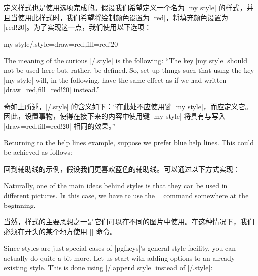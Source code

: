 定义样式也是使用选项完成的。假设我们希望定义一个名为 |my style| 的样式，并且当使用此样式时，我们希望将绘制颜色设置为 |red|，将填充颜色设置为 |red!20|。为了实现这一点，我们使用以下选项：
%
\begin{codeexample}
my style/.style={draw=red,fill=red!20}
\end{codeexample}

The meaning of the curious |/.style| is the following: ``The key |my style|
should not be used here but, rather, be defined. So, set up things such that
using the key |my style| will, in the following, have the same effect as if we
had written |draw=red,fill=red!20| instead.''

奇如上所述，|/.style| 的含义如下：“在此处不应使用键 |my style|，而应定义它。因此，设置事物，使得在接下来的内容中使用键 |my style| 将具有与写入 |draw=red,fill=red!20| 相同的效果。”

Returning to the help lines example, suppose we prefer blue help lines. This
could be achieved as follows:

回到辅助线的示例，假设我们更喜欢蓝色的辅助线。可以通过以下方式实现：
%
\begin{codeexample}[]
\end{codeexample}

Naturally, one of the main ideas behind styles is that they can be used in
different pictures. In this case, we have to use the |\tikzset| command
somewhere at the beginning.

当然，样式的主要思想之一是它们可以在不同的图片中使用。在这种情况下，我们必须在开头的某个地方使用 |\tikzset| 命令。
%
\begin{codeexample}[]
\end{codeexample}

Since styles are just special cases of |pgfkeys|'s general style facility, you
can actually do quite a bit more. Let us start with adding options to an
already existing style. This is done using |/.append style| instead of
|/.style|:

